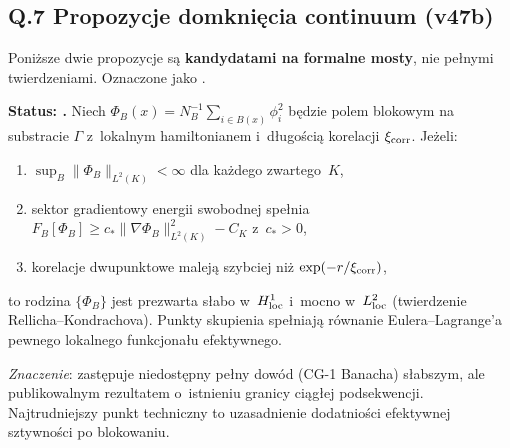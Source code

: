 \bigskip
\begin{center}
\end{center}

\subsection*{Q.7 Propozycje domkni\k{e}cia continuum (v47b)}
\label{ssec:Q-continuum-proposals}

Poni\.zsze dwie propozycje s\k{a} \textbf{kandydatami na formalne mosty},
nie pe\l{}nymi twierdzeniami. Oznaczone jako .

\begin{proposition}%
\label{prop:Q-weak-continuum}
\textbf{Status: .}
Niech $\Phi_B(x) = N_B^{-1}\sum_{i \in B(x)} \phi_i^2$
b\k{e}dzie polem blokowym na substracie $\Gamma$
z~lokalnym hamiltonianem i~d\l{}ugo\'sci\k{a} korelacji $\xi_{\rm corr}$.
Je\.zeli:
\begin{enumerate}[nosep]
  \item $\sup_B \|\Phi_B\|_{L^2(K)} < \infty$ dla ka\.zdego
    zwartego~$K$,
  \item sektor gradientowy energii swobodnej spe\l{}nia
    $F_B[\Phi_B] \ge c_* \|\nabla\Phi_B\|^2_{L^2(K)} - C_K$
    z~$c_* > 0$,
  \item korelacje dwupunktowe malej\k{a} szybciej ni\.z
    $\exp(-r/\xi_{\rm corr})$,
\end{enumerate}
to rodzina $\{\Phi_B\}$ jest prezwarta s\l{}abo w~$H^1_{\rm loc}$
i~mocno w~$L^2_{\rm loc}$ (twierdzenie Rellicha--Kondrachova).
Punkty skupienia spe\l{}niaj\k{a} r\'ownanie Eulera--Lagrange'a
pewnego lokalnego funkcjona\l{}u efektywnego.

\medskip\noindent
\textit{Znaczenie}: zast\k{e}puje niedost\k{e}pny pe\l{}ny dow\'od
(CG-1 Banacha) s\l{}abszym, ale publikowalnym rezultatem
o~istnieniu granicy ci\k{a}g\l{}ej podsekwencji.
Najtrudniejszy punkt techniczny to uzasadnienie
dodatnio\'sci efektywnej sztywno\'sci po blokowaniu.
\end{proposition}

